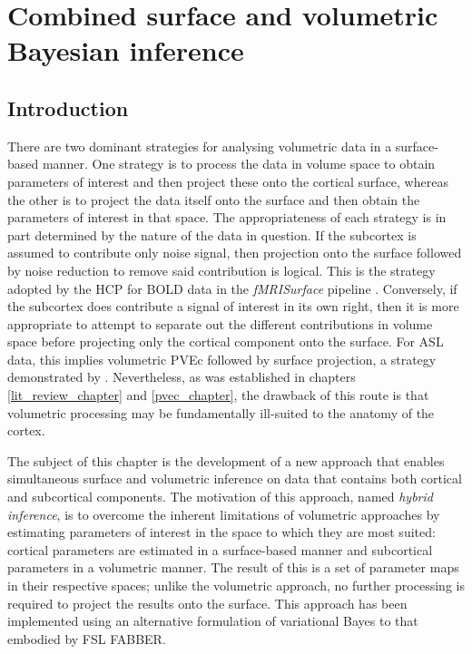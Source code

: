  

\chapter{Combined surface and volumetric Bayesian inference}
\label{svb_chapter}

\section{Introduction}

There are two dominant strategies for analysing volumetric data in a surface-based manner. One strategy is to process the data in volume space to obtain parameters of interest and then project these onto the cortical surface, whereas the other is to project the data itself onto the surface and then obtain the parameters of interest in that space. The appropriateness of each strategy is in part determined by the nature of the data in question. If the subcortex is assumed to contribute only noise signal, then projection onto the surface followed by noise reduction to remove said contribution is logical. This is the strategy adopted by the HCP for BOLD data in the \textit{fMRISurface} pipeline \cite{Glasser2013}. Conversely, if the subcortex does contribute a signal of interest in its own right, then it is more appropriate to attempt to separate out the different contributions in volume space before projecting only the cortical component onto the surface. For ASL data, this implies volumetric PVEc followed by surface projection, a strategy demonstrated by \cite{Verclytte2015}. Nevertheless, as was established in chapters \ref{lit_review_chapter} and \ref{pvec_chapter}, the drawback of this route is that volumetric processing may be fundamentally ill-suited to the anatomy of the cortex. 

The subject of this chapter is the development of a new approach that enables simultaneous surface and volumetric inference on data that contains both cortical and subcortical components. The motivation of this approach, named \textit{hybrid inference}, is to overcome the inherent limitations of volumetric approaches by estimating parameters of interest in the space to which they are most suited: cortical parameters are estimated in a surface-based manner and subcortical parameters in a volumetric manner. The result of this is a set of parameter maps in their respective spaces; unlike the volumetric approach, no further processing is required to project the results onto the surface. This approach has been implemented using an alternative formulation of variational Bayes to that embodied by FSL FABBER. 

